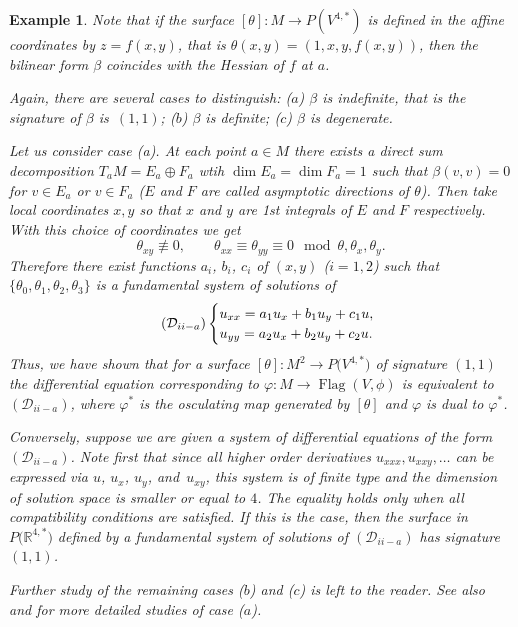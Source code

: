 \documentclass[pdftex]{sigma}%
\newcommand{\R}{\mathbb R}
\newcommand{\cD}{\mathcal D}
\newcommand{\Flag}{\operatorname{Flag}}
\newtheorem{ex}[thm]{Example}
\numberwithin{equation}{section}
\begin{document}
\begin{ex}
Note that if the surface $[\theta]\colon M\to P(V^{4,*})$ is defined in the affine coordinates by $z=f(x,y)$, that is $\theta(x,y)=(1,x,y,f(x,y))$, then the bilinear form $\beta$ coincides with the Hessian of $f$ at $a$.

Again, there are several cases to distinguish: ($a$) $\beta$ is indefinite, that is the signature of $\beta$ is~$(1,1)$; ($b$) $\beta$ is definite; ($c$) $\beta$ is degenerate.

Let us consider case (a). At each point $a\in M$ there exists a direct sum decomposition $T_aM=E_a\oplus F_a$ wtih $\dim E_a=\dim F_a=1$ such that $\beta(v,v)=0$ for $v\in E_a$ or $v\in F_a$ ($E$ and $F$ are called asymptotic directions of $\theta$). Then take local coordinates $x,y$ so that $x$ and $y$ are 1st integrals of $E$ and $F$ respectively. With this choice of coordinates we get
\[
\theta_{xy} \not\equiv 0, \qquad \theta_{xx}\equiv\theta_{yy}\equiv 0 \mod \theta,\theta_x,\theta_y.
\]
Therefore there exist functions $a_i$, $b_i$, $c_i$ of $(x,y)$ ($i=1,2$) such that $\{\theta_0,\theta_1,\theta_2,\theta_3\}$ is a fundamental system of solutions of
\begin{equation}
\tag{$\cD_{ii-a}$}
\begin{cases}
u_{xx} = a_1u_x+b_1u_y+c_1u,
\\
u_{yy} = a_2u_x+b_2u_y+c_2u.
\end{cases}
\end{equation}
Thus, we have shown that for a surface $[\theta]\colon M^2\to P\big(V^{4,*}\big)$ of signature $(1,1)$ the differential equation corresponding to $\varphi\colon M\to \Flag(V,\phi)$ is equivalent to $(\cD_{ii-a})$, where $\varphi^*$ is the osculating map generated by $[\theta]$ and $\varphi$ is dual to $\varphi^*$.

Conversely, suppose we are given a system of differential equations of the form $(\cD_{ii-a})$. Note first that since all higher order derivatives $u_{xxx}, u_{xxy}, \dots $ can be expressed via $u$, $u_x$, $u_y$, and~$u_{xy}$, this system is of finite type and the dimension of solution space is smaller or equal to $4$. The equality holds only when all compatibility conditions are satisfied. If this is the case, then the surface in $P\big(\R^{4,*}\big)$ defined by a fundamental system of solutions of $(\cD_{ii-a})$ has signature~$(1,1)$.

Further study of the remaining cases ($b$) and ($c$) is left to the reader. See also~\cite{wilch2} and \cite{sasaki2, sasaki1} for more detailed studies of case ($a$).


\end{ex}
\end{document}
